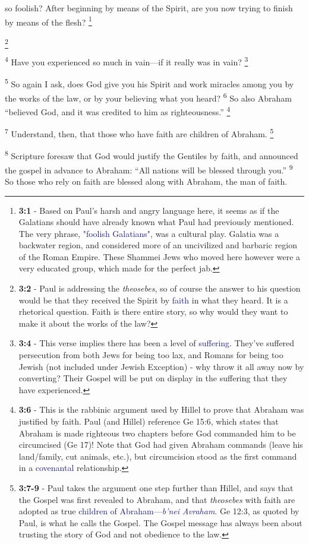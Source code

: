 \documentclass[12pt,twoside]{article}
\newcommand{\vs}[1]{\textsuperscript{#1}}
\newcommand{\vnote}[2]{%
  \begingroup
  \renewcommand\thefootnote{}%
  \footnote{\scriptsize \textbf{}#2}%
  \addtocounter{footnote}{-1}%
  \endgroup
}
\begin{document}
 \noindent so foolish? After beginning by means of the Spirit, are you now trying to finish by means of the flesh?\vnote{1}{\textbf{3:1} - Based on Paul's harsh and angry language here, it seems as if the Galatians should have already known what Paul had previously mentioned. The very phrase, \textcolor{MidnightBlue}{"foolish Galatians"}, was a cultural play. Galatia was a backwater region, and considered more of an uncivilized and barbaric region of the Roman Empire. These Shammei Jews who moved here however were a very educated group, which made for the perfect jab.}\vnote{2}{\textbf{3:2} - Paul is addressing the \textit{theosebes}, so of course the answer to his question would be that they received the Spirit by \textcolor{MidnightBlue}{faith} in what they heard. It is a  rhetorical question. Faith is there entire story, so why would they want to make it about the works of the law?}
 \vs{4} Have you experienced so much in vain---if it really was in vain?\vnote{4}{\textbf{3:4} - This verse implies there has been a level of \textcolor{MidnightBlue}{suffering}. They've suffered persecution from both Jews for being too lax, and Romans for being too Jewish (not included under Jewish Exception) - why throw it all away now by converting? Their Gospel will be put on display in the suffering that they have experienced.}
 \vs{5} So again I ask, does God give you his Spirit and work miracles among you by the works of the law, or by your believing what you heard?
 \vs{6} So also Abraham ``believed God, and it was credited to him as righteousness.''\vnote{6}{\textbf{3:6} - This is the rabbinic argument used by Hillel to prove that Abraham was justified by faith. Paul (and Hillel) reference Ge 15:6, which states that Abraham is made righteous two chapters before God commanded him to be circumcised (Ge 17)! Note that God had given Abraham commands (leave his land/family, cut animals, etc.), but circumcision stood as the first command in a \textcolor{MidnightBlue}{covenantal} relationship.}

 \vs{7} Understand, then, that those who have faith are children of Abraham.\vnote{7}{\textbf{3:7-9} - Paul takes the argument one step further than Hillel, and says that the Gospel was first revealed to Abraham, and that \textit{theosebes} with faith are adopted as true \textcolor{MidnightBlue}{children of Abraham---\textit{b'nei Avraham}}. Ge 12:3, as quoted by Paul, is what he calls the Gospel. The Gospel message has always been about trusting the story of God and not obedience to the law.}
 \vs{8} Scripture foresaw that God would justify the Gentiles by faith, and announced the gospel in advance to Abraham: ``All nations will be blessed through you.''
 \vs{9} So those who rely on faith are blessed along with Abraham, the man of faith.
\end{document}
